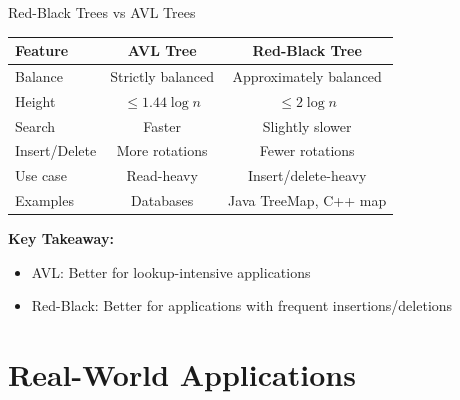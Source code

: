 \documentclass[aspectratio=169]{beamer}
\begin{document}
\begin{frame}{Red-Black Trees vs AVL Trees}
  \begin{table}
    \centering
    \begin{tabular}{|l|c|c|}
      \hline
      \textbf{Feature} & \textbf{AVL Tree} & \textbf{Red-Black Tree} \\
      \hline
      Balance & Strictly balanced & Approximately balanced \\
      \hline
      Height & $\leq 1.44 \log n$ & $\leq 2 \log n$ \\
      \hline
      Search & Faster & Slightly slower \\
      \hline
      Insert/Delete & More rotations & Fewer rotations \\
      \hline
      Use case & Read-heavy & Insert/delete-heavy \\
      \hline
      Examples & Databases & Java TreeMap, C++ map \\
      \hline
    \end{tabular}
  \end{table}

  \vspace{0.5cm}
  \textbf{Key Takeaway:}
  \begin{itemize}
    \item AVL: Better for lookup-intensive applications
    \item Red-Black: Better for applications with frequent insertions/deletions
  \end{itemize}
\end{frame}

\section{Real-World Applications}
\end{document}
